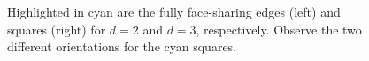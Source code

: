 \begin{figure}[t!]
\begin{subfigure}{.47\textwidth}
        \label{fig:tiling_six}
    \end{subfigure}
    \caption{Highlighted in cyan are the fully face-sharing edges (left) and squares (right) for $d=2$ and $d=3$, respectively. Observe the two different orientations for the cyan squares.}
    \label{fig:tilings_five_six}
\end{figure}
